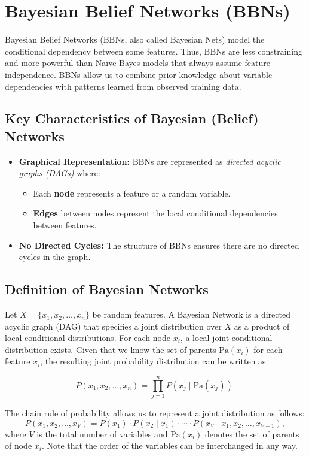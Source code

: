 \documentclass{article}
\begin{document}
\section*{Bayesian Belief Networks (BBNs)}

Bayesian Belief Networks (BBNs, also called Bayesian Nets) model the conditional dependency between some features. Thus, BBNs are less constraining and more powerful than Naïve Bayes models that always assume feature independence. BBNs allow us to combine prior knowledge about variable dependencies with patterns learned from observed training data.

\subsection*{Key Characteristics of Bayesian (Belief) Networks}
\begin{itemize}
    \item \textbf{Graphical Representation:} BBNs are represented as \textit{directed acyclic graphs (DAGs)} where:
    \begin{itemize}
        \item Each \textbf{node} represents a feature or a random variable.
        \item \textbf{Edges} between nodes represent the local conditional dependencies between features.
    \end{itemize}
    \item \textbf{No Directed Cycles:} The structure of BBNs ensures there are no directed cycles in the graph.
\end{itemize}

\subsection*{Definition of Bayesian Networks}
Let $X = \{x_1, x_2, \dots, x_n\}$ be random features. A Bayesian Network is a directed acyclic graph (DAG) that specifies a joint distribution over $X$ as a product of local conditional distributions. For each node $x_i$, a local joint conditional distribution exists. Given that we know the set of parents $\text{Pa}(x_i)$ for each feature $x_i$, the resulting joint probability distribution can be written as:

\[
P(x_1, x_2, \dots, x_n) = \prod_{j=1}^n P(x_j \mid \text{Pa}(x_j)).
\]

\noindent The chain rule of probability allows us to represent a joint distribution as follows:
\[
P(x_1, x_2, \dots, x_V) = P(x_1) \cdot P(x_2 \mid x_1) \cdot \cdots \cdot P(x_V \mid x_1, x_2, \dots, x_{V-1}),
\]
where $V$ is the total number of variables and $\text{Pa}(x_i)$ denotes the set of parents of node $x_i$. Note that the order of the variables can be interchanged in any way.
\end{document}
